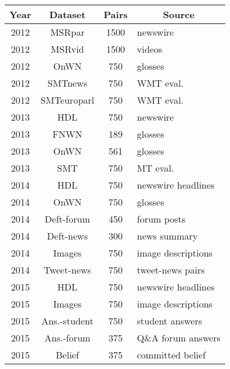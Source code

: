\begin{enumerate}
 \begin{table}[ht!]
 	\centering
 	\begin{tabular}{c|c|c|l}
 		\hline
 		\multicolumn{1}{c|}{\textbf{Year}} & 
 		\multicolumn{1}{c|}{\textbf{Dataset}} & 
 		\multicolumn{1}{c|}{\textbf{Pairs}} & 
 		\multicolumn{1}{c}{\textbf{Source}} \\
 		\hline
 		2012 \cite{agirre-etal-2012-semeval} & MSRpar & 1500 & newswire \\
 		2012 \cite{agirre-etal-2012-semeval} & MSRvid & 1500 & videos \\
 		2012 \cite{agirre-etal-2012-semeval} & OnWN & 750 & glosses \\
 		2012 \cite{agirre-etal-2012-semeval} & SMTnews & 750 & WMT eval. \\
 		2012 \cite{agirre-etal-2012-semeval} & SMTeuroparl & 750 & WMT eval. \\
 		\hline
 		2013 \cite{agirre-etal-2013-sem} & HDL & 750 & newswire \\
 		2013 \cite{agirre-etal-2013-sem} & FNWN & 189 & glosses \\
 		2013 \cite{agirre-etal-2013-sem} & OnWN & 561 & glosses \\
 		2013 \cite{agirre-etal-2013-sem} & SMT & 750 & MT eval. \\
 		\hline
 		2014 \cite{agirre-etal-2014-semeval} & HDL & 750 & newswire headlines \\
 		2014 \cite{agirre-etal-2014-semeval} & OnWN & 750 & glosses \\
 		2014 \cite{agirre-etal-2014-semeval} & Deft-forum & 450 & forum posts \\
 		2014 \cite{agirre-etal-2014-semeval} & Deft-news & 300 & news summary \\
 		2014 \cite{agirre-etal-2014-semeval} & Images & 750 & image descriptions \\
 		2014 \cite{agirre-etal-2014-semeval} & Tweet-news & 750 & tweet-news pairs \\
 		\hline
 		2015 \cite{agirre-etal-2015-semeval} & HDL & 750 & newswire headlines \\
 		2015 \cite{agirre-etal-2015-semeval} & Images & 750 & image descriptions \\
 		2015 \cite{agirre-etal-2015-semeval} & Ans.-student & 750 & student answers \\
 		2015 \cite{agirre-etal-2015-semeval} & Ans.-forum & 375 & Q\&A forum answers \\
 		2015 \cite{agirre-etal-2015-semeval} & Belief & 375 & committed belief \\

\end{tabular}
\end{table}
\end{enumerate}
